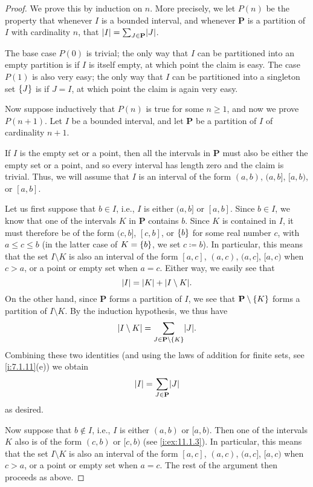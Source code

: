 \begin{proof}
  We prove this by induction on \(n\).
  More precisely, we let \(P(n)\) be the property that whenever \(I\) is a bounded interval, and whenever \(\mathbf{P}\) is a partition of \(I\) with cardinality \(n\), that \(\abs{I} = \sum_{J \in \mathbf{P}} \abs{J}\).

  The base case \(P(0)\) is trivial;
  the only way that \(I\) can be partitioned into an empty partition is if \(I\) is itself empty, at which point the claim is easy.
  The case \(P(1)\) is also very easy;
  the only way that \(I\) can be partitioned into a singleton set \(\left\lbrace J\right\rbrace\) is if \(J = I\), at which point the claim is again very easy.

  Now suppose inductively that \(P(n)\) is true for some \(n \geq 1\), and now we prove \(P(n + 1)\).
  Let \(I\) be a bounded interval, and let \(\mathbf{P}\) be a partition of \(I\) of cardinality \(n + 1\).

  If \(I\) is the empty set or a point, then all the intervals in \(\mathbf{P}\) must also be either the empty set or a point, and so every interval has length zero and the claim is trivial.
  Thus, we will assume that \(I\) is an interval of the form \((a, b)\), \((a, b]\), \([a, b)\), or \([a, b]\).

      Let us first suppose that \(b \in I\), i.e., \(I\) is either \((a, b]\) or \([a, b]\).
  Since \(b \in I\), we know that one of the intervals \(K\) in \(\mathbf{P}\) contains \(b\).
  Since \(K\) is contained in \(I\), it must therefore be of the form \((c, b]\), \([c, b]\), or \(\left\lbrace b\right\rbrace\) for some real number \(c\), with \(a \leq c \leq b\) (in the latter case of \(K = \left\lbrace b\right\rbrace\), we set \(c \coloneqq b\)).
  In particular, this means that the set \(I \setminus K\) is also an interval of the form \([a, c]\), \((a, c)\), \((a, c]\), \([a, c)\) when \(c > a\), or a point or empty set when \(a = c\).
  Either way, we easily see that
  \[
    \abs{I} = \abs{K} + \abs{I \setminus K}.
  \]
  On the other hand, since \(\mathbf{P}\) forms a partition of \(I\), we see that \(\mathbf{P} \setminus \left\lbrace K\right\rbrace\) forms a partition of \(I \setminus K\).
  By the induction hypothesis, we thus have
  \[
    \abs{I \setminus K} = \sum_{J \in \mathbf{P} \setminus \set{K}} \abs{J}.
  \]
  Combining these two identities (and using the laws of addition for finite sets, see \cref{i:7.1.11}(e)) we obtain
  \[
    \abs{I} = \sum_{J \in \mathbf{P}} \abs{J}
  \]
  as desired.

  Now suppose that \(b \notin I\), i.e., \(I\) is either \((a, b)\) or \([a, b)\).
  Then one of the intervals \(K\) also is of the form \((c, b)\) or \([c, b)\) (see \cref{i:ex:11.1.3}).
      In particular, this means that the set \(I \setminus K\) is also an interval of the form \([a, c]\), \((a, c)\), \((a, c]\), \([a, c)\) when \(c > a\), or a point or empty set when \(a = c\).
  The rest of the argument then proceeds as above.
\end{proof}

